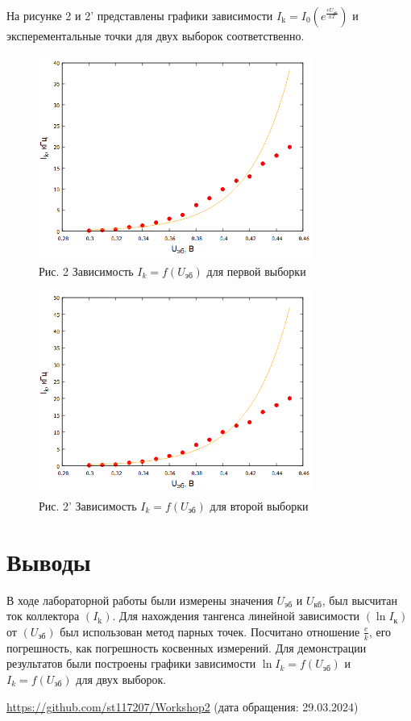На рисунке 2 и 2' представлены графики зависимости $    I_{\mathrm{k}} = I_{0} \left(e^{\frac{e U_{\text{эб}}}{k T}}\right)$ и эксперементальные точки для двух выборок соответственно. 
\begin{figure}[H]
\centering
\includegraphics[width=0.8\textwidth]{График 3.png}
\caption*{Рис. 2 Зависимость $I_k=f(U_{\text{эб}})$ для первой выборки }
\label{fig:gist}
\end{figure}
\begin{figure}[H]
\centering
\includegraphics[width=0.8\textwidth]{График 4.png}
\caption*{Рис. 2' Зависимость $I_k=f(U_{\text{эб}})$ для второй выборки}
\label{fig:gist}
\end{figure}
\section{Выводы}
В ходе лабораторной работы были измерены значения $U_{\text{эб}}$ и $U_{\text{кб}}$, был высчитан ток коллектора $(I_{\text{k}})$. Для нахождения тангенса линейной зависимости $(\ln I_{\text{к}})$ от $(U_{\text{эб}})$ был использован метод парных точек. Посчитано отношение $\frac{e}{k}$, его погрешность, как погрешность косвенных измерений. Для демонстрации результатов были построены графики зависимости $\ln I_k=f(U_{\text{эб}})$ и $I_k=f(U_{\text{эб}})$ для двух выборок.


\begin{thebibliography}{9}

\url{https://github.com/st117207/Workshop2}  (дата обращения: 29.03.2024) 


\end{thebibliography}

